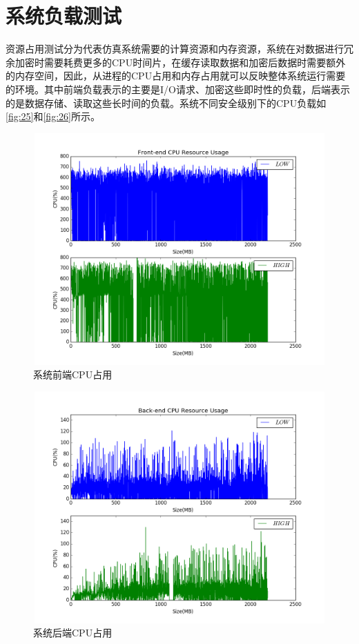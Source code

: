 \section{系统负载测试}
资源占用测试分为代表仿真系统需要的计算资源和内存资源，系统在对数据进行冗余加密时需要耗费更多的CPU时间片，在缓存读取数据和加密后数据时需要额外的内存空间，因此，从进程的CPU占用和内存占用就可以反映整体系统运行需要的环境。其中前端负载表示的主要是I/O请求、加密这些即时性的负载，后端表示的是数据存储、读取这些长时间的负载。系统不同安全级别下的CPU负载如\autoref{fig:25}和\autoref{fig:26}所示。
\begin{figure}[H]
	\centering
	\includegraphics[width=1\textwidth,height=3.5in]{Pics/figure_cpu_client.png}
	\caption{系统前端CPU占用}
	\label{fig:25}
\end{figure}
\begin{figure}[H]
	\centering
	\includegraphics[width=1\textwidth,height=3.5in]{Pics/figure_cpu_server.png}
	\caption{系统后端CPU占用}
	\label{fig:26}
\end{figure}
